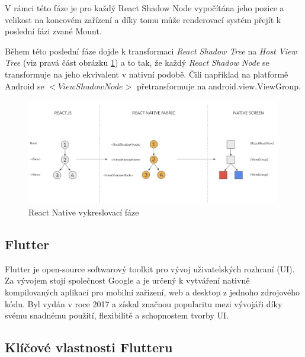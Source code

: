V rámci této fáze je pro každý React Shadow Node vypočítána jeho pozice a velikost na koncovém zařízení a díky tomu může renderovací systém
přejít k poslední fázi zvané Mount. \cite{reactNativeRenderCommitMount}

Během této poslední fáze dojde k transformaci \textit{React Shadow Tree} na \textit{Host View Tree} (viz pravá část obrázku \ref{fig:react-native-render-pipeline}) a to tak, že každý \textit{React Shadow Node}
se transformuje na jeho ekvivalent v nativní podobě. \cite{reactNativeRenderCommitMount} Čili například na platformě Android se $<ViewShadowNode>$ přetransformuje na android.view.ViewGroup. \cite{reactNativeRenderCommitMount}

\begin{figure}[H]
  \centering
  \includegraphics[width=0.99\textwidth]{react-native-render-pipeline.png}
  \caption{React Native vykreslovací fáze}
  \label{fig:react-native-render-pipeline}
\end{figure}

\subsection{Flutter}
Flutter je open-source softwarový toolkit pro vývoj uživatelských rozhraní (UI). \cite{flutterfaq} Za vývojem stojí společnost Google a je určený k vytváření nativně kompilovaných 
aplikací pro mobilní zařízení, web a desktop z jednoho zdrojového kódu. \cite{flutterfaq}
Byl vydán v roce 2017 a získal značnou popularitu mezi vývojáři díky svému snadnému použití, flexibilitě a schopnostem tvorby UI.

\subsection*{Klíčové vlastnosti Flutteru}

